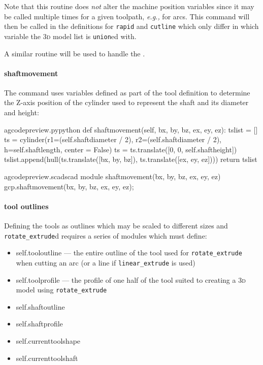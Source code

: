 \documentclass{ltxdoc}
\begin{document}
\noindent Note that this routine does \emph{not} alter the machine position variables since it may be called multiple times for a given toolpath, \emph{e.g.,} for arcs. This command will then be called in the definitions for \verb|rapid| and \verb|cutline| which only differ in which variable the \textsc{3d} model list is \verb|union|ed with.

A similar routine will be used to handle the .

\paragraph{shaftmovement} The  command uses variables defined as part of the tool definition to determine the Z-axis position of the cylinder used to represent the shaft and its diameter and height:

\lstset{firstnumber=\thegcpy}
\begin{writecode}{a}{gcodepreview.py}{python}
    def shaftmovement(self, bx, by, bz, ex, ey, ez):
        tslist = []
        ts = cylinder(r1=(self.shaftdiameter / 2), r2=(self.shaftdiameter / 2), h=self.shaftlength, center = False)
        ts = ts.translate([0, 0, self.shaftheight])
        tslist.append(hull(ts.translate([bx, by, bz]), ts.translate([ex, ey, ez])))
        return tslist

\end{writecode}
\addtocounter{gcpy}{7}

\lstset{firstnumber=\thegcpscad}
\begin{writecode}{a}{gcodepreview.scad}{scad}
module shaftmovement(bx, by, bz, ex, ey, ez){
    gcp.shaftmovement(bx, by, bz, ex, ey, ez);
}

\end{writecode}
\addtocounter{gcpscad}{4}

\paragraph{tool outlines}

Defining the tools as outlines which may be scaled to different sizes and \verb|rotate_extrude|d requires a series of modules which must define:

\begin{itemize}
\item self.tooloutline --- the entire outline of the tool used for \verb|rotate_extrude| when cutting an arc (or a line if \verb|linear_extrude| is used)
\item self.toolprofile --- the profile of one half of the tool suited to creating a \textsc{3d} model using \verb|rotate_extrude|
\item self.shaftoutline
\item self.shaftprofile
\item self.currenttoolshape
\item self.currenttoolshaft
\end{itemize}
\end{document}
